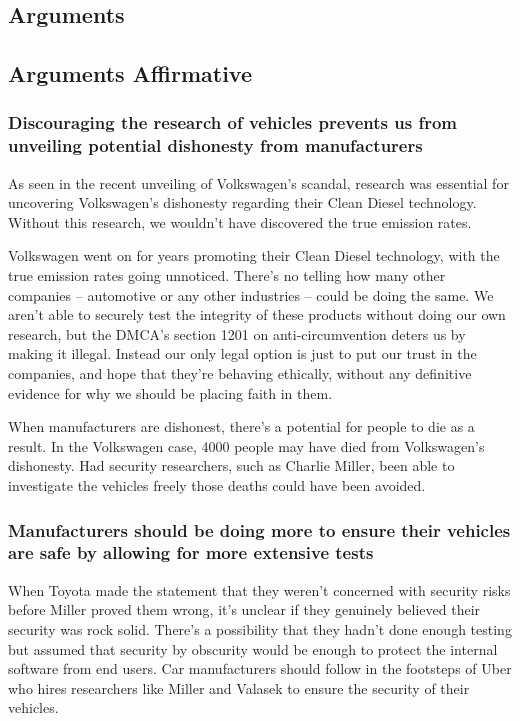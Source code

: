 \documentclass[12pt]{article}
\begin{document}
\begin{multicols}{2}
\section{Arguments}

\subsection{Arguments Affirmative}

\subsubsection{Discouraging the research of vehicles prevents us from unveiling potential dishonesty from manufacturers}

As seen in the recent unveiling of Volkswagen's scandal, research was essential for uncovering Volkswagen's dishonesty regarding their Clean Diesel technology. \cite{vwScandal} Without this research, we wouldn't have discovered the true emission rates.

Volkswagen went on for years promoting their Clean Diesel technology, with the true emission rates going unnoticed. There's no telling how many other companies -- automotive or any other industries -- could be doing the same. We aren't able to securely test the integrity of these products without doing our own research, but the DMCA's section 1201 on anti-circumvention deters us by making it illegal. Instead our only legal option is just to put our trust in the companies, and hope  that they're behaving ethically, without any definitive evidence for why we should be placing faith in them. \cite{brokeDMCA} 

When manufacturers are dishonest, there's a potential for people to die as a result. In the Volkswagen case, 4000 people may have died from Volkswagen's dishonesty.\cite{vwkills} Had security researchers, such as Charlie Miller, been able to investigate the vehicles freely those deaths could have been avoided.



\subsubsection{Manufacturers should be doing more to ensure their vehicles are safe by allowing for more extensive tests}

When Toyota made the statement that they weren't concerned with security risks \cite{originalHack} before Miller proved them wrong, it's unclear if they genuinely believed their security was rock solid. There's a possibility that they hadn't done enough testing but assumed that security by obscurity would be enough to protect the internal software from end users\cite{brokeDMCA}. Car manufacturers should follow in the footsteps of Uber who hires researchers like Miller and Valasek to ensure the security of their vehicles\cite{uber}.



\end{multicols}
\end{document}
